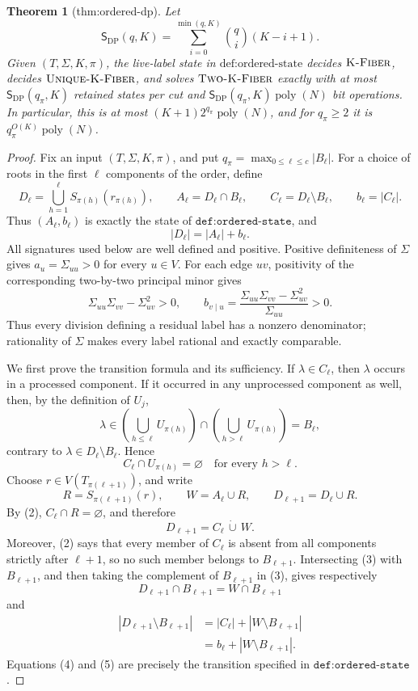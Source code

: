 \documentclass{article}
\newtheorem{theorem}{Theorem}
\begin{document}
\begin{theorem}[thm:ordered-dp]\label{thm:ordered-dp}
Let
\[
 \mathsf S_{\mathrm{DP}}(q,K)
 =\sum_{i=0}^{\min(q,K)}\binom qi(K-i+1).
\]
Given \((T,\Sigma,K,\pi)\), the live-label state in \(\text{def:ordered-state}\) decides \(\textsc{K-Fiber}\), decides \(\textsc{Unique-K-Fiber}\), and solves \(\textsc{Two-K-Fiber}\) exactly with at most \(\mathsf S_{\mathrm{DP}}(q_\pi,K)\) retained states per cut and \(\mathsf S_{\mathrm{DP}}(q_\pi,K)\operatorname{poly}(N)\) bit operations. In particular, this is at most \((K+1)2^{q_\pi}\operatorname{poly}(N)\), and for \(q_\pi\ge 2\) it is \(q_\pi^{O(K)}\operatorname{poly}(N)\).
\end{theorem}
\begin{proof}
Fix an input \((T,\Sigma,K,\pi)\), and put \(q_\pi=\max_{0\leq \ell\leq c}|B_\ell|\).  For a choice of roots in the first \(\ell\) components of the order, define
\[
D_\ell=\bigcup_{h=1}^{\ell}S_{\pi(h)}(r_{\pi(h)}),
\qquad
A_\ell=D_\ell\cap B_\ell,
\qquad
C_\ell=D_\ell\setminus B_\ell,
\qquad
b_\ell=|C_\ell|.
\]
Thus \((A_\ell,b_\ell)\) is exactly the state of \(\texttt{def:ordered-state}\), and
\[
|D_\ell|=|A_\ell|+b_\ell. \tag{1}
\]
All signatures used below are well defined and positive.  Positive definiteness of \(\Sigma\) gives \(a_u=\Sigma_{uu}>0\) for every \(u\in V\).  For each edge \(uv\), positivity of the corresponding two-by-two principal minor gives
\[
\Sigma_{uu}\Sigma_{vv}-\Sigma_{uv}^{2}>0,
\qquad
b_{v\mid u}=\frac{\Sigma_{uu}\Sigma_{vv}-\Sigma_{uv}^{2}}{\Sigma_{uu}}>0.
\]
Thus every division defining a residual label has a nonzero denominator; rationality of \(\Sigma\) makes every label rational and exactly comparable.

We first prove the transition formula and its sufficiency.  If \(\lambda\in C_\ell\), then \(\lambda\) occurs in a processed component.  If it occurred in any unprocessed component as well, then, by the definition of \(U_j\),
\[
\lambda\in
\left(\bigcup_{h\leq\ell}U_{\pi(h)}\right)
\cap
\left(\bigcup_{h>\ell}U_{\pi(h)}\right)
=B_\ell,
\]
contrary to \(\lambda\in D_\ell\setminus B_\ell\).  Hence
\[
C_\ell\cap U_{\pi(h)}=\varnothing
\quad\text{for every }h>\ell. \tag{2}
\]
Choose \(r\in V(T_{\pi(\ell+1)})\), and write
\[
R=S_{\pi(\ell+1)}(r),
\qquad
W=A_\ell\cup R,
\qquad
D_{\ell+1}=D_\ell\cup R.
\]
By (2), \(C_\ell\cap R=\varnothing\), and therefore
\[
D_{\ell+1}=C_\ell\,\dot\cup\,W. \tag{3}
\]
Moreover, (2) says that every member of \(C_\ell\) is absent from all components strictly after \(\ell+1\), so no such member belongs to \(B_{\ell+1}\).  Intersecting (3) with \(B_{\ell+1}\), and then taking the complement of \(B_{\ell+1}\) in (3), gives respectively
\[
D_{\ell+1}\cap B_{\ell+1}=W\cap B_{\ell+1} \tag{4}
\]
and
\[
\begin{aligned}
|D_{\ell+1}\setminus B_{\ell+1}|
&=|C_\ell|+|W\setminus B_{\ell+1}|\\
&=b_\ell+|W\setminus B_{\ell+1}|. \tag{5}
\end{aligned}
\]
Equations (4) and (5) are precisely the transition specified in \(\texttt{def:ordered-state}\).


\end{proof}
\end{document}
